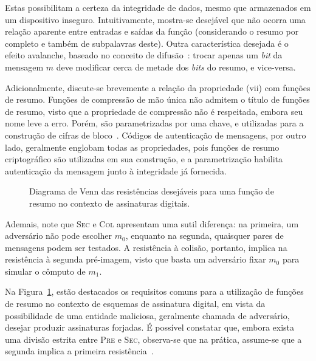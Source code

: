 \documentclass{ufsctex/ufsctex}
\begin{document}
Estas possibilitam a certeza da integridade de dados, mesmo que armazenados em
um dispositivo inseguro. Intuitivamente, mostra-se desejável que não ocorra uma
relação aparente entre entradas e saídas da função (considerando o resumo por
completo e também de subpalavras deste). Outra característica desejada é o
efeito avalanche, baseado no conceito de
difusão~\cite{Stallings:2010:CNS:1824151}: trocar apenas um \emph{bit} da
mensagem $m$ deve modificar cerca de metade dos \emph{bits} do resumo, e
vice-versa.

Adicionalmente, discute-se brevemente a relação da propriedade (vii) com
funções de resumo. Funções de compressão de mão única não admitem o título de
funções de resumo, visto que a propriedade de compressão não é respeitada,
embora seu nome leve a erro. Porém, são parametrizadas por uma chave, e
utilizadas para a construção de cifras de
bloco~\cite[9.25]{Menezes:1996:HAC:548089}. Códigos de autenticação de
mensagens, por outro lado, geralmente englobam todas as propriedades, pois
funções de resumo criptográfico são utilizadas em sua construção, e a
parametrização habilita autenticação da mensagem junto à integridade já
fornecida.

\begin{figure}[h]
  \centering
  \caption{Diagrama de Venn das resistências desejáveis para uma função de
    resumo no contexto de assinaturas digitais.}\label{fig:1}
\end{figure}

Ademais, note que \textsc{Sec} e \textsc{Col} apresentam uma sutil diferença:
na primeira, um adversário não pode escolher $m_0$, enquanto na segunda,
quaisquer pares de mensagens podem ser testados. A resistência à colisão,
portanto, implica na resistência à segunda pré-imagem, visto que basta um
adversário fixar $m_0$ para simular o cômputo de $m_1$.

Na Figura~\ref{fig:1}, estão destacados os requisitos comuns para a utilização
de funções de resumo no contexto de esquemas de assinatura digital, em vista da
possibilidade de uma entidade maliciosa, geralmente chamada de adversário,
desejar produzir assinaturas forjadas. É possível constatar que, embora exista
uma divisão estrita entre \textsc{Pre} e \textsc{Sec}, observa-se que na
prática, assume-se que a segunda implica a primeira
resistência~\cite[9.20]{Menezes:1996:HAC:548089}.
\end{document}
